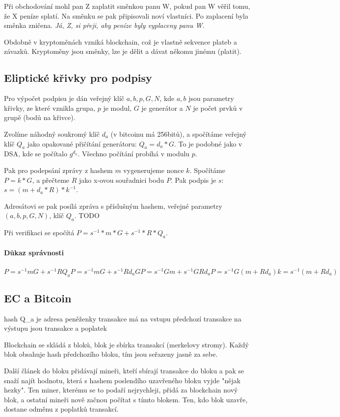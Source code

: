 Při obchodování mohl pan Z zaplatit směnkou panu W, pokud pan W věřil tomu, že X peníze splatí. Na směnku se pak připisovali noví vlastníci. Po zaplacení byla směnka zničena. \textit{Já, Z, si přeji, aby peníze byly vyplaceny panu W.}

Obdobně v kryptoměnách vzniká blockchain, což je vlastně sekvence plateb a závazků. Kryptoměny jsou směnky, lze je dělit a dávat někomu jinému (platit).

\subsection{Eliptické křivky pro podpisy}

Pro výpočet podpisu je dán veřejný klíč $a, b, p, G, N$, kde $a, b$ jsou parametry křivky, ze které vznikla grupa, $p$ je modul, $G$ je generátor a $N$ je počet prvků v grupě (bodů na křivce).

Zvolíme náhodný soukromý klíč $d_a$ (v bitcoinu má 256bitů), a spočítáme veřejný klíč $Q_a$ jako opakované přičítání generátoru: $Q_a = d_a * G$. To je podobné jako v DSA, kde se počítalo $g^{d_a}$. Všechno počítání probíhá v modulu $p$.

Pak pro podepsání zprávy z hashem $m$ vygenerujeme nonce $k$. Spočítáme $P = k * G$, a přečteme $R$ jako x-ovou souřadnici bodu $P$. Pak podpis je $s$: $s = (m + d_a * R) * k^{-1}$.

Adresátovi se pak posílá zpráva s příslušným hashem, veřejné parametry $(a, b, p, G, N)$, klíč $Q_a$.
TODO

Při verifikaci se spočítá $P = s^{-1} * m * G + s^{-1} * R * Q_a$.

\paragraph{Důkaz správnosti}
$
P = s^{-1} m G + s^{-1} R Q_a
P = s^{-1} m G + s^{-1} R d_a G
P = s^{-1} G m + s^{-1} G R d_a
P = s^{-1} G (m + R d_a)
k = s^{-1} (m + R d_a)$

\subsection{EC a Bitcoin}

hash Q_a je adresa peněženky
transakce má na vstupu předchozí transakce
na výstupu jsou transakce a poplatek

Blockchain se skládá z bloků, blok je sbírka transakcí (merkelovy stromy). Každý blok obsahuje hash předchozího bloku, tím jsou seřazeny jasně za sebe.

Další článek do bloku přidávají mineři, kteří sbírají transakce do bloku a pak se snaží najít hodnotu, která s hashem poslendího uzavřeného bloku vyjde "nějak hezky". Ten miner, kterému se to podaří nejrychleji, přidá za blockchain nový blok, a ostatní mineři nově začnou počítat s tímto blokem. Ten, kdo blok uzavře, dostane odměnu z poplatků transakcí.


